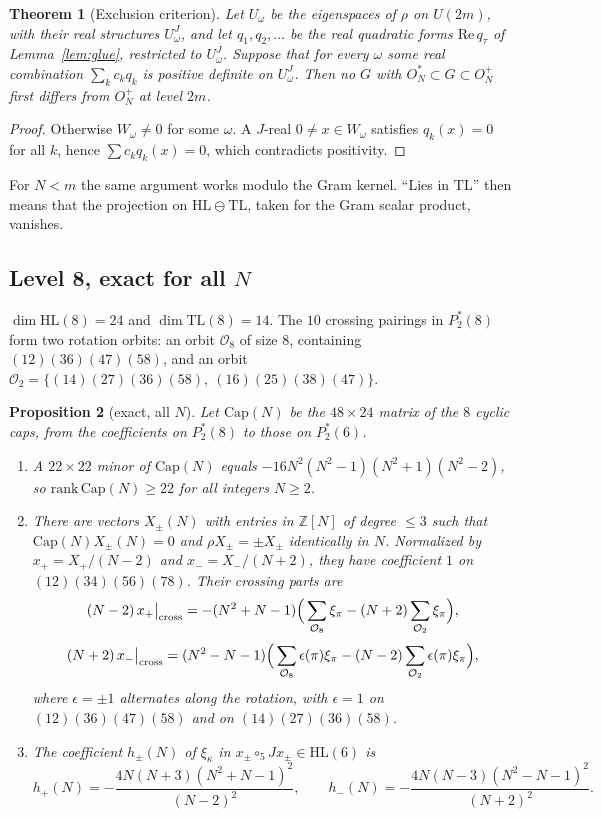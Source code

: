 \documentclass[11pt]{amsart}
\newtheorem{theorem}{Theorem}[section]
\newtheorem{proposition}[theorem]{Proposition}
\theoremstyle{definition}
\theoremstyle{remark}
\theoremstyle{plain}
\numberwithin{equation}{section}
\numberwithin{table}{section}
\newcommand{\Z}{\mathbb Z}
\newcommand{\TL}{\mathrm{TL}}
\newcommand{\HL}{\mathrm{HL}}
\begin{document}
\begin{theorem}[Exclusion criterion]\label{thm:crit}
Let $U_\omega$ be the eigenspaces of $\rho$ on $U(2m)$, with their real structures $U_\omega^J$, and let
$q_1,q_2,\dots$ be the real quadratic forms $\mathrm{Re}\,q_\tau$ of Lemma~\ref{lem:glue}, restricted to $U_\omega^J$. Suppose that for every
$\omega$ some real combination $\sum_kc_kq_k$ is positive definite on $U_\omega^J$. Then no $G$ with
$O_N^*\subset G\subset O_N^+$ first differs from $O_N^+$ at level $2m$.
\end{theorem}
\begin{proof}
Otherwise $W_\omega\neq0$ for some $\omega$. A $J$-real $0\ne x\in W_\omega$ satisfies $q_k(x)=0$ for all $k$,
hence $\sum c_kq_k(x)=0$, which contradicts positivity.
\end{proof}

For $N<m$ the same argument works modulo the Gram kernel. ``Lies in $\TL$'' then means that the projection on
$\HL\ominus\TL$, taken for the Gram scalar product, vanishes.

\subsection{Level 8, exact for all $N$}

$\dim\HL(8)=24$ and $\dim\TL(8)=14$. The $10$ crossing pairings in $P_2^*(8)$ form two rotation orbits: an orbit
$\mathcal O_8$ of size $8$, containing $(12)(36)(47)(58)$, and an orbit $\mathcal O_2=\{(14)(27)(36)(58),\ (16)(25)(38)(47)\}$.

\begin{proposition}[exact, all $N$]\label{prop:eightpair}
Let $\mathrm{Cap}(N)$ be the $48\times24$ matrix of the $8$ cyclic caps, from the coefficients on $P_2^*(8)$ to
those on $P_2^*(6)$.
\begin{enumerate}
\item A $22\times22$ minor of $\mathrm{Cap}(N)$ equals $-16N^2(N^2-1)(N^2+1)(N^2-2)$, so $\mathrm{rank}\,\mathrm{Cap}(N)\ge22$ for all integers $N\ge2$.
\item There are vectors $X_\pm(N)$ with entries in $\Z[N]$ of degree $\le3$ such that $\mathrm{Cap}(N)X_\pm(N)=0$ and
$\rho X_\pm=\pm X_\pm$ identically in $N$. Normalized by $x_+=X_+/(N-2)$ and $x_-=X_-/(N+2)$, they have coefficient $1$ on
$(12)(34)(56)(78)$. Their crossing parts are
\[
(N-2)\,x_+\big|_{\rm cross}=-(N^2+N-1)\Big(\sum_{\mathcal O_8}\xi_\pi-(N+2)\sum_{\mathcal O_2}\xi_\pi\Big),
\]
\[
(N+2)\,x_-\big|_{\rm cross}=(N^2-N-1)\Big(\sum_{\mathcal O_8}\epsilon(\pi)\xi_\pi-(N-2)\sum_{\mathcal O_2}\epsilon(\pi)\xi_\pi\Big),
\]
where $\epsilon=\pm1$ alternates along the rotation, with $\epsilon=1$ on $(12)(36)(47)(58)$ and on $(14)(27)(36)(58)$.
\item The coefficient $h_\pm(N)$ of $\xi_\kappa$ in $x_\pm\circ_5Jx_\pm\in\HL(6)$ is
\[
h_+(N)=-\frac{4N(N+3)(N^2+N-1)^2}{(N-2)^2},\qquad h_-(N)=-\frac{4N(N-3)(N^2-N-1)^2}{(N+2)^2}.
\]
\end{enumerate}
\end{proposition}
\end{document}
